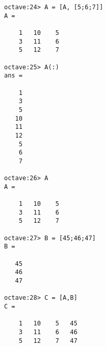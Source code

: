 \begin{lstlisting}[basicstyle=\small]
octave:24> A = [A, [5;6;7]]
A =

    1   10    5
    3   11    6
    5   12    7

octave:25> A(:)
ans =

    1
    3
    5
   10
   11
   12
    5
    6
    7

octave:26> A
A =

    1   10    5
    3   11    6
    5   12    7

octave:27> B = [45;46;47]
B =

   45
   46
   47

octave:28> C = [A,B]
C =

    1   10    5   45
    3   11    6   46
    5   12    7   47


\end{lstlisting}


